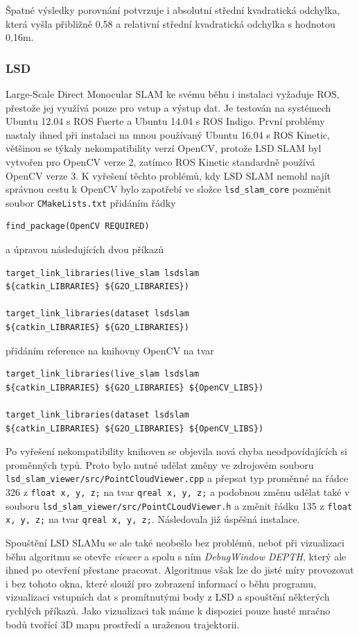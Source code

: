 \documentclass[12pt,a4paper]{article}
\begin{document}
Špatné výsledky porovnání potvrzuje i absolutní střední kvadratická odchylka, která vyšla přibližně 0,58 a relativní střední kvadratická odchylka s hodnotou 0,16m.


\subsubsection{LSD}
Large-Scale Direct Monocular SLAM ke svému běhu i instalaci vyžaduje ROS, přestože jej využívá pouze pro vstup a výstup dat. Je testován na systémech Ubuntu 12.04 s ROS Fuerte a Ubuntu 14.04 s ROS Indigo. První problémy nastaly ihned při instalaci na mnou používaný Ubuntu 16.04 s ROS Kinetic, většinou se týkaly nekompatibility verzí OpenCV, protože LSD SLAM byl vytvořen pro OpenCV verze 2, zatímco ROS Kinetic standardně používá OpenCV verze 3. K vyřešení těchto problémů, kdy LSD SLAM nemohl najít správnou cestu k OpenCV bylo zapotřebí ve složce \texttt{lsd\_slam\_core} pozměnit soubor \texttt{CMakeLists.txt} přidáním řádky
\begin{verbatim}
find_package(OpenCV REQUIRED)
\end{verbatim}
a úpravou následujících dvou příkazů
\begin{verbatim}
target_link_libraries(live_slam lsdslam 
${catkin_LIBRARIES} ${G2O_LIBRARIES})

target_link_libraries(dataset lsdslam 
${catkin_LIBRARIES} ${G2O_LIBRARIES})
\end{verbatim}
přidáním reference na knihovny OpenCV na tvar
\begin{verbatim}
target_link_libraries(live_slam lsdslam 
${catkin_LIBRARIES} ${G2O_LIBRARIES} ${OpenCV_LIBS})

target_link_libraries(dataset lsdslam 
${catkin_LIBRARIES} ${G2O_LIBRARIES} ${OpenCV_LIBS})
\end{verbatim}

Po vyřešení nekompatibility knihoven se objevila nová chyba neodpovídajících si \newline proměnných typů. Proto bylo nutné udělat změny ve zdrojovém souboru \newline \texttt{lsd\_slam\_viewer/src/PointCloudViewer.cpp} a přepsat typ proměnné na řádce 326 z \texttt{float x, y, z;} na tvar \texttt{qreal x, y, z;} a podobnou změnu udělat také v souboru \texttt{lsd\_slam\_viewer/src/PointCLoudViewer.h} a změnit řádku 135 z \texttt{float x, y, z;} na tvar \texttt{qreal x, y, z;}. Následovala již úspěšná instalace.

Spouštění LSD SLAMu se ale také neobešlo bez problémů, neboť při vizualizaci běhu algoritmu se otevře \textit{viewer} a spolu s ním \textit{DebugWindow DEPTH}, který ale ihned po otevření přestane pracovat. Algoritmus však lze do jisté míry provozovat i bez tohoto okna, které slouží pro zobrazení informací o běhu programu, vizualizaci vstupních dat s promítnutými body z LSD a spouštění některých rychlých příkazů. Jako vizualizaci tak máme k dispozici pouze husté mračno bodů tvořící 3D mapu prostředí a uraženou trajektorii.
\end{document}
